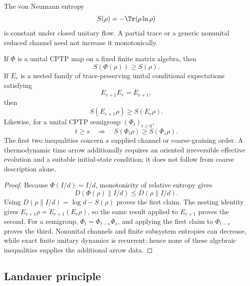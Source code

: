 \documentclass[12pt,a4paper]{article}
\begin{document}
The von Neumann entropy
\begin{equation}
\label{p4:eq:entropy}
S(\rho)=-\Tr(\rho\ln\rho)
\end{equation}
is constant under closed unitary flow.  A partial trace or a generic
nonunital reduced channel need not increase it monotonically.

\begin{proposition}
\label{p4:prop:unital-coarse-entropy}
If \(\Phi\) is a unital CPTP map on a fixed finite matrix algebra, then
\[
S(\Phi(\rho))\ge S(\rho).
\]
If \(E_r\) is a nested family of trace-preserving unital conditional
expectations satisfying
\[
E_{r+1}E_r=E_{r+1},
\]
then
\[
S(E_{r+1}\rho)\ge S(E_r\rho).
\]
Likewise, for a unital CPTP semigroup \((\Phi_t)_{t\ge0}\),
\[
t\ge s\quad\Longrightarrow\quad
S(\Phi_t\rho)\ge S(\Phi_s\rho).
\]
The first two inequalities concern a supplied channel or coarse-graining
order.  A thermodynamic time arrow additionally requires an oriented
irreversible effective evolution and a suitable initial-state condition; it
does not follow from coarse description alone.
\end{proposition}

\begin{proof}
Because \(\Phi(I/d)=I/d\), monotonicity of relative entropy gives
\[
D(\Phi(\rho)\|I/d)
\le D(\rho\|I/d).
\]
Using \(D(\rho\|I/d)=\log d-S(\rho)\) proves the first claim.  The nesting
identity gives \(E_{r+1}\rho=E_{r+1}(E_r\rho)\), so the same result applied to
\(E_{r+1}\) proves the second.  For a semigroup,
\(\Phi_t=\Phi_{t-s}\Phi_s\), and applying the first claim to
\(\Phi_{t-s}\) proves the third.  Nonunital channels and finite subsystem
entropies can decrease, while exact finite unitary dynamics is recurrent;
hence none of these algebraic inequalities supplies the additional arrow
data.
\end{proof}



\subsection{Landauer principle}
\label{p4:sec:part3-landauer}
\end{document}
